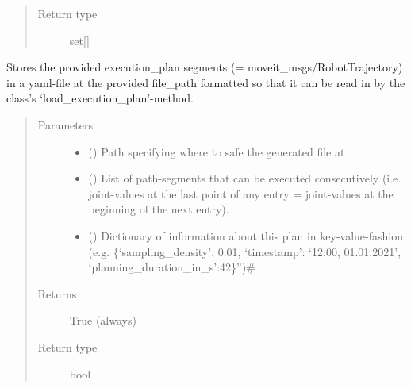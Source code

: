 \documentclass[letterpaper,10pt,english]{sphinxmanual}
\begin{document}
\begin{fulllineitems}
\begin{fulllineitems}
\begin{quote}
\begin{description}
\item[{Return type}] \leavevmode
set{[}{\hyperref[\detokenize{module_view:agiprobot_measurement.viewpoint.ViewPoint}]{}}{]}

\end{description}\end{quote}

\end{fulllineitems}


\begin{fulllineitems}
\label{\detokenize{module_trajectory_manager:agiprobot_measurement.trajectory_manager.TrajectoryManager.store_execution_plan}}
Stores the provided execution\_plan segments (= moveit\_msgs/RobotTrajectory) in a yaml-file at the provided file\_path formatted so that it can be read in by the class’s ‘load\_execution\_plan’-method.
\begin{quote}\begin{description}
\item[{Parameters}] \leavevmode\begin{itemize}
\item {} 
 () \textendash{} Path specifying where to safe the generated file at

\item {} 
 () \textendash{} List of path-segments that can be executed consecutively (i.e. joint-values at the last point of any entry = joint-values at the beginning of the next entry).

\item {} 
 () \textendash{} Dictionary of information about this plan in key-value-fashion (e.g. \{‘sampling\_density’: 0.01, ‘timestamp’: ‘12:00, 01.01.2021’, ‘planning\_duration\_in\_s’:42\}”)\#

\end{itemize}

\item[{Returns}] \leavevmode
True (always)

\item[{Return type}] \leavevmode
bool

\end{description}\end{quote}

\end{fulllineitems}


\end{fulllineitems}
\end{document}
